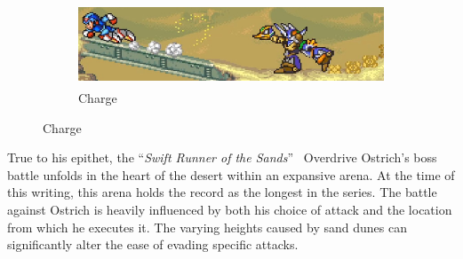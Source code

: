 \begin{figure}[htp]
	\centering
		\begin{subfigure}{\linewidth}
			\centering
	\includegraphics[height=2.5cm]{figures/X2/Overdrive_ostrich/Ostrich_running.png}
	\caption{Charge}
		\end{subfigure}
\end{figure}
True to his epithet, the ``\textit{Swift Runner of the Sands}''~\cite{book:MMX_Complete_art} Overdrive Ostrich's boss battle unfolds in the heart of the desert within an expansive arena. At the time of this writing, this arena holds the record as the longest in the series. The battle against Ostrich is heavily influenced by both his choice of attack and the location from which he executes it. The varying heights caused by sand dunes can significantly alter the ease of evading specific attacks.
